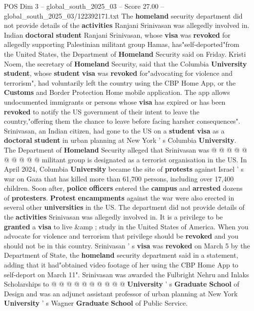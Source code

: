 \begin{textsample}{POS Dim 3 – global\_south\_2025\_03 – Score 27.00 – global\_south\_2025\_03/122392171.txt}  \label{ex:f3_pos_040}
The \textbf{homeland} security department did not provide details of the \textbf{activities} Ranjani Srinivasan was allegedly involved in.
Indian \textbf{doctoral} \textbf{student} Ranjani Srinivasan, whose \textbf{visa} was \textbf{revoked} for allegedly supporting Palestinian militant group Hamas, has"self-deported"from the United States, the Department of \textbf{Homeland} Security said on Friday.
Kristi Noem, the secretary of \textbf{Homeland} Security, said that the Columbia \textbf{University} \textbf{student}, whose \textbf{student} \textbf{visa} was \textbf{revoked} for"advocating for violence and terrorism", had voluntarily left the country using the CBP Home App, or the \textbf{Customs} and Border Protection Home mobile application.
The app allows undocumented immigrants or persons whose \textbf{visa} has expired or has been \textbf{revoked} to notify the US government of their intent to leave the country,"offering them the chance to leave before facing harsher consequences".
Srinivasan, an Indian citizen, had gone to the US on a \textbf{student} \textbf{visa} as a \textbf{doctoral} \textbf{student} in urban planning at New York ' s Columbia \textbf{University}.
The Department of \textbf{Homeland} Security alleged that Srinivasan was @ @ @ @ @ @ @ @ @ @ militant group is designated as a terrorist organisation in the US.
In April 2024, Columbia \textbf{University} became the site of \textbf{protests} against Israel ' s war on Gaza that has killed more than 61,700 persons, including over 17,400 children.
Soon after, \textbf{police} \textbf{officers} entered the \textbf{campus} and \textbf{arrested} dozens of \textbf{protesters}. \textbf{Protest} \textbf{encampments} against the war were also erected in several other \textbf{universities} in the US.
The department did not provide details of the \textbf{activities} Srinivasan was allegedly involved in.
It is a privilege to be \textbf{granted} a \textbf{visa} to live \&amp ; study in the United States of America.
When you advocate for violence and terrorism that privilege should be \textbf{revoked} and you should not be in this country.
Srinivasan ' s \textbf{visa} was \textbf{revoked} on March 5 by the Department of State, the \textbf{homeland} security department said in a statement, adding that it had"obtained video footage of her using the CBP Home App to self-deport on March 11".
Srinivasan was awarded the Fulbright Nehru and Inlaks Scholarships to @ @ @ @ @ @ @ @ @ @ \textbf{University} ' s \textbf{Graduate} \textbf{School} of Design and was an adjunct assistant professor of urban planning at New York \textbf{University} ' s Wagner \textbf{Graduate} \textbf{School} of Public Service.

\end{textsample}
